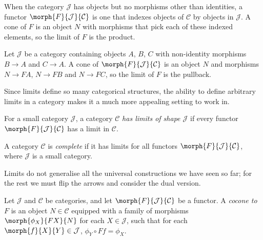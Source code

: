 \begin{example}[Products]\label{ex:product-limit}
    When the category \(\mathcal{J}\) has objects but no morphisms other than
    identities, a functor \(\morph{F}{\mathcal{J}}{\mathcal{C}}\) is one that
    indexes objects of \(\mathcal{C}\) by objects in \(\mathcal{J}\).
    A cone of \(F\) is an object \(N\) with morphisms that pick each of these
    indexed elements, so the limit of \(F\) is the product.
\end{example}

\begin{example}[Pullbacks]\label{ex:pullback-limit}
    Let \(\mathcal{J}\) be a category containing objects \(A\), \(B\),
    \(C\) with non-identity morphisms \(B \to A\) and \(C \to A\).
    A cone of \(\morph{F}{\mathcal{J}}{\mathcal{C}}\) is an object \(N\) and
    morphisms \(N \to FA\), \(N \to FB\) and \(N \to FC\), so the limit of
    \(F\) is the pullback.
\end{example}

Since limits define so many categorical structures, the ability to define
arbitrary limits in a category makes it a much more appealing setting to work
in.

\begin{definition}
    For a small category \(\mathcal{J}\), a category \(\mathcal{C}\)
    \emph{has limits of shape \(\mathcal{J}\)} if every functor
    \(\morph{F}{\mathcal{J}}{\mathcal{C}}\) has a limit in \(\mathcal{C}\).
\end{definition}

\begin{definition}
    A category \(\mathcal{C}\) is \emph{complete} if it has limits for all
    functors \(\morph{F}{\mathcal{J}}{\mathcal{C}}\), where \(\mathcal{J}\) is a
    small category.
\end{definition}

Limits do not generalise all the universal constructions we have seen so far;
for the rest we must flip the arrows and consider the dual version.

\begin{definition}[Cocone]
    Let \(\mathcal{J}\) and \(\mathcal{C}\) be categories, and let
    \(\morph{F}{\mathcal{J}}{\mathcal{C}}\) be a functor.
    A \emph{cocone to \(F\)} is an object \(N \in \mathcal{C}\) equipped with
    a family of morphisms \(\morph{\phi_X}{FX}{N}\) for each
    \(X \in \mathcal{J}\), such that for each
    \(\morph{f}{X}{Y} \in \mathcal{J}\),
    \(\phi_Y \circ Ff = \phi_X\).
    \begin{center}
        
    \end{center}
\end{definition}

